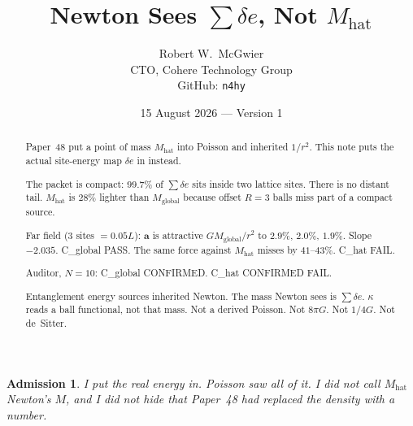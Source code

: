 \documentclass[11pt]{article}
\title{\textbf{Newton Sees $\sum\delta e$, Not $M_{\mathrm{hat}}$}}
\author{Robert W.\ McGwier\\
\small CTO, Cohere Technology Group\\
\small GitHub: \texttt{n4hy}}
\date{15 August 2026 --- Version 1}
\newtheorem*{admission}{Admission}
\begin{document}
\maketitle

\begin{abstract}
\noindent
Paper~48 put a point of mass $M_{\mathrm{hat}}$ into Poisson
and inherited $1/r^2$. This note puts the actual site-energy
map $\delta e$ in instead.

The packet is compact: $99.7\%$ of $\sum\delta e$ sits inside
two lattice sites. There is no distant tail.
$M_{\mathrm{hat}}$ is $28\%$ lighter than $M_{\mathrm{global}}$
because offset $R=3$ balls miss part of a compact source.

Far field (3 sites $=0.05L$): $\mathbf{a}$ is attractive
$GM_{\mathrm{global}}/r^2$ to $2.9\%$, $2.0\%$, $1.9\%$.
Slope $-2.035$. C\_global PASS. The same force against
$M_{\mathrm{hat}}$ misses by $41$--$43\%$. C\_hat FAIL.

Auditor, $N=10$: C\_global CONFIRMED. C\_hat CONFIRMED FAIL.

Entanglement energy sources inherited Newton. The mass
Newton sees is $\sum\delta e$. $\kappa$ reads a ball
functional, not that mass. Not a derived Poisson. Not
$8\pi G$. Not $1/4G$. Not de~Sitter.
\end{abstract}

\begin{admission}
I put the real energy in. Poisson saw all of it. I did not
call $M_{\mathrm{hat}}$ Newton's $M$, and I did not hide
that Paper~48 had replaced the density with a number.
\end{admission}
\end{document}
